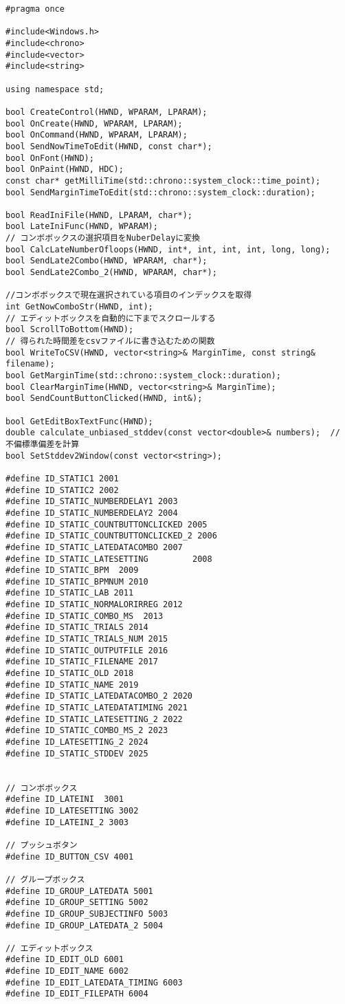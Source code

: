 \begin{lstlisting}[caption=window.h]
#pragma once

#include<Windows.h>
#include<chrono>
#include<vector>
#include<string>

using namespace std;

bool CreateControl(HWND, WPARAM, LPARAM);
bool OnCreate(HWND, WPARAM, LPARAM);
bool OnCommand(HWND, WPARAM, LPARAM);
bool SendNowTimeToEdit(HWND, const char*);
bool OnFont(HWND);
bool OnPaint(HWND, HDC);
const char* getMilliTime(std::chrono::system_clock::time_point);
bool SendMarginTimeToEdit(std::chrono::system_clock::duration);

bool ReadIniFile(HWND, LPARAM, char*);
bool LateIniFunc(HWND, WPARAM);
// コンボボックスの選択項目をNuberDelayに変換
bool CalcLateNumberOfloops(HWND, int*, int, int, int, long, long);
bool SendLate2Combo(HWND, WPARAM, char*);
bool SendLate2Combo_2(HWND, WPARAM, char*);

//コンボボックスで現在選択されている項目のインデックスを取得
int GetNowComboStr(HWND, int);
// エディットボックスを自動的に下までスクロールする
bool ScrollToBottom(HWND);
// 得られた時間差をcsvファイルに書き込むための関数
bool WriteToCSV(HWND, vector<string>& MarginTime, const string& filename);
bool GetMarginTime(std::chrono::system_clock::duration);
bool ClearMarginTime(HWND, vector<string>& MarginTime);
bool SendCountButtonClicked(HWND, int&);

bool GetEditBoxTextFunc(HWND);
double calculate_unbiased_stddev(const vector<double>& numbers);  // 不偏標準偏差を計算
bool SetStddev2Window(const vector<string>);

#define ID_STATIC1 2001
#define ID_STATIC2 2002
#define ID_STATIC_NUMBERDELAY1 2003
#define ID_STATIC_NUMBERDELAY2 2004
#define ID_STATIC_COUNTBUTTONCLICKED 2005
#define ID_STATIC_COUNTBUTTONCLICKED_2 2006
#define ID_STATIC_LATEDATACOMBO 2007
#define ID_STATIC_LATESETTING         2008
#define ID_STATIC_BPM  2009
#define ID_STATIC_BPMNUM 2010
#define ID_STATIC_LAB 2011
#define ID_STATIC_NORMALORIRREG 2012
#define ID_STATIC_COMBO_MS  2013
#define ID_STATIC_TRIALS 2014
#define ID_STATIC_TRIALS_NUM 2015
#define ID_STATIC_OUTPUTFILE 2016
#define ID_STATIC_FILENAME 2017
#define ID_STATIC_OLD 2018
#define ID_STATIC_NAME 2019
#define ID_STATIC_LATEDATACOMBO_2 2020
#define ID_STATIC_LATEDATATIMING 2021
#define ID_STATIC_LATESETTING_2 2022
#define ID_STATIC_COMBO_MS_2 2023
#define ID_LATESETTING_2 2024
#define ID_STATIC_STDDEV 2025


// コンボボックス
#define ID_LATEINI  3001
#define ID_LATESETTING 3002
#define ID_LATEINI_2 3003

// プッシュボタン
#define ID_BUTTON_CSV 4001

// グループボックス
#define ID_GROUP_LATEDATA 5001
#define ID_GROUP_SETTING 5002
#define ID_GROUP_SUBJECTINFO 5003
#define ID_GROUP_LATEDATA_2 5004

// エディットボックス
#define ID_EDIT_OLD 6001
#define ID_EDIT_NAME 6002
#define ID_EDIT_LATEDATA_TIMING 6003
#define ID_EDIT_FILEPATH 6004
\end{lstlisting}

